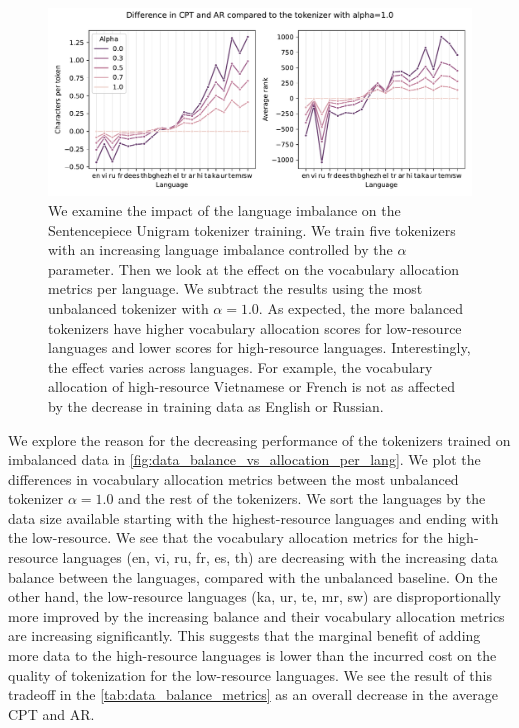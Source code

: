 \begin{figure}[h]
    \centering
    \includegraphics[width=\textwidth]{figures/ar_cpt_vs_alpha.pdf}
    \caption{We examine the impact of the language imbalance on the Sentencepiece Unigram tokenizer training. We train five tokenizers with an increasing language imbalance controlled by the $\alpha$ parameter. Then we look at the effect on the vocabulary allocation metrics per language. We subtract the results using the most unbalanced tokenizer with $\alpha=1.0$. As expected, the more balanced tokenizers have higher vocabulary allocation scores for low-resource languages and lower scores for high-resource languages. Interestingly, the effect varies across languages. For example, the vocabulary allocation of high-resource Vietnamese or French is not as affected by the decrease in training data as English or Russian.}
    \label{fig:data_balance_vs_allocation_per_lang}
\end{figure}

We explore the reason for the decreasing performance of the tokenizers trained on imbalanced data in \autoref{fig:data_balance_vs_allocation_per_lang}. We plot the differences in vocabulary allocation metrics between the most unbalanced tokenizer $\alpha=1.0$ and the rest of the tokenizers. We sort the languages by the data size available starting with the highest-resource languages and ending with the low-resource. We see that the vocabulary allocation metrics for the high-resource languages (en, vi, ru, fr, es, th) are decreasing with the increasing data balance between the languages, compared with the unbalanced baseline. On the other hand, the low-resource languages (ka, ur, te, mr, sw) are disproportionally more improved by the increasing balance and their vocabulary allocation metrics are increasing significantly. This suggests that the marginal benefit of adding more data to the high-resource languages is lower than the incurred cost on the quality of tokenization for the low-resource languages. We see the result of this tradeoff in the \autoref{tab:data_balance_metrics} as an overall decrease in the average CPT and AR.

